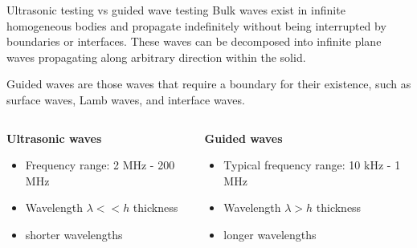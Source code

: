 \documentclass[10pt,aspectratio=169,dvipsnames]{beamer} %
\begin{document}
	\begin{frame}{Ultrasonic testing vs guided wave testing}
		\alert{Bulk waves} exist in infinite homogeneous bodies and propagate indefinitely without being interrupted by boundaries or interfaces. 
		These waves can be decomposed into infinite plane waves propagating along arbitrary direction within the solid.
		
		\alert{Guided waves} are those waves that require a boundary for their existence, such as surface waves, Lamb waves, and interface waves.
		\vspace{5mm}
		\begin{columns}[T]
			\begin{column}{0.5\textwidth}
				\textbf{Ultrasonic waves}	
				\begin{itemize}
					\item Frequency range: 2 MHz - 200 MHz
					\item Wavelength \(\lambda << h\) thickness 
					\item shorter wavelengths
				\end{itemize}
			\end{column}
			\begin{column}{0.5\textwidth}
				\textbf{Guided waves}	
				\begin{itemize}
					\item Typical frequency range: 10 kHz - 1 MHz
					\item Wavelength \(\lambda > h\) thickness 
					\item longer wavelengths
				\end{itemize}
			\end{column}
		\end{columns}			
	\end{frame}
\end{document}
